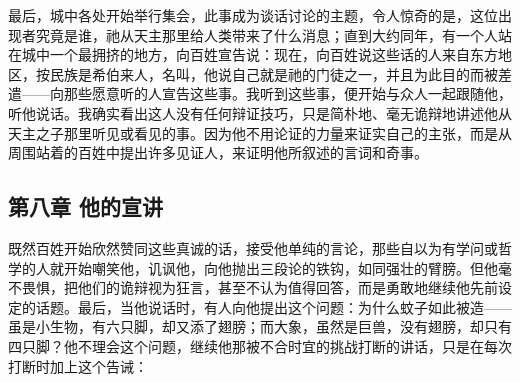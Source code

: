 最后，城中各处开始举行集会，此事成为谈话讨论的主题，令人惊奇的是，这位出现者究竟是谁，祂从天主那里给人类带来了什么消息；直到大约同年，有一个人站在城中一个最拥挤的地方，向百姓宣告说：现在，向百姓说这些话的人来自东方地区，按民族是希伯来人，名叫，他说自己就是祂的门徒之一，并且为此目的而被差遣——向那些愿意听的人宣告这些事。我听到这些事，便开始与众人一起跟随他，听他说话。我确实看出这人没有任何辩证技巧，只是简朴地、毫无诡辩地讲述他从天主之子那里听见或看见的事。因为他不用论证的力量来证实自己的主张，而是从周围站着的百姓中提出许多见证人，来证明他所叙述的言词和奇事。\par


\subsection{第八章 他的宣讲}

既然百姓开始欣然赞同这些真诚的话，接受他单纯的言论，那些自以为有学问或哲学的人就开始嘲笑他，讥讽他，向他抛出三段论的铁钩，如同强壮的臂膀。但他毫不畏惧，把他们的诡辩视为狂言，甚至不认为值得回答，而是勇敢地继续他先前设定的话题。最后，当他说话时，有人向他提出这个问题：为什么蚊子如此被造——虽是小生物，有六只脚，却又添了翅膀；而大象，虽然是巨兽，没有翅膀，却只有四只脚？他不理会这个问题，继续他那被不合时宜的挑战打断的讲话，只是在每次打断时加上这个告诫：\par


